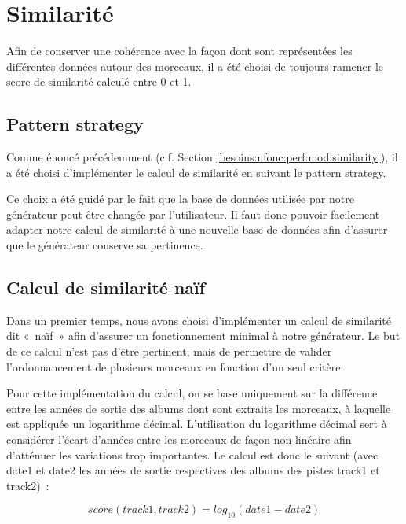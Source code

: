 \section{Similarité}
\label{impl:similarite}

Afin de conserver une cohérence avec la façon dont sont représentées les
différentes données autour des morceaux, il a été choisi de toujours ramener
le score de similarité calculé entre 0 et 1.

\subsection{Pattern strategy}
\label{impl:similatite:strategy}

Comme énoncé précédemment (c.f. Section
\ref{besoins:nfonc:perf:mod:similarity}), il a été choisi d'implémenter le 
calcul de similarité en suivant le pattern strategy.\newline

Ce choix a été guidé par le fait que la base de données utilisée par notre
générateur peut être changée par l'utilisateur. Il faut donc pouvoir
facilement adapter notre calcul de similarité à une nouvelle base de données
afin d'assurer que le générateur conserve sa pertinence.

\subsection{Calcul de similarité naïf}
\label{impl:similarite:naif}

Dans un premier temps, nous avons choisi d'implémenter un calcul de similarité
dit «~naïf~» afin d'assurer un fonctionnement minimal à notre générateur. 
Le but de ce calcul n'est pas d'être pertinent, mais de permettre de valider
l'ordonnancement de plusieurs morceaux en fonction d'un seul critère.

Pour cette implémentation du calcul, on se base uniquement sur la différence
entre les années de sortie des albums dont sont extraits les morceaux, à
laquelle est appliquée un logarithme décimal. L'utilisation du logarithme
décimal sert à considérer l'écart d'années entre les morceaux de façon
non-linéaire afin d'atténuer les variations trop importantes. Le calcul est
donc le suivant (avec date1 et date2 les années de sortie respectives des 
albums des pistes track1 et track2)~:

\begin{equation*}
  score(track1, track2) = log_{10}(date1 - date2)
\end{equation*}\newline

